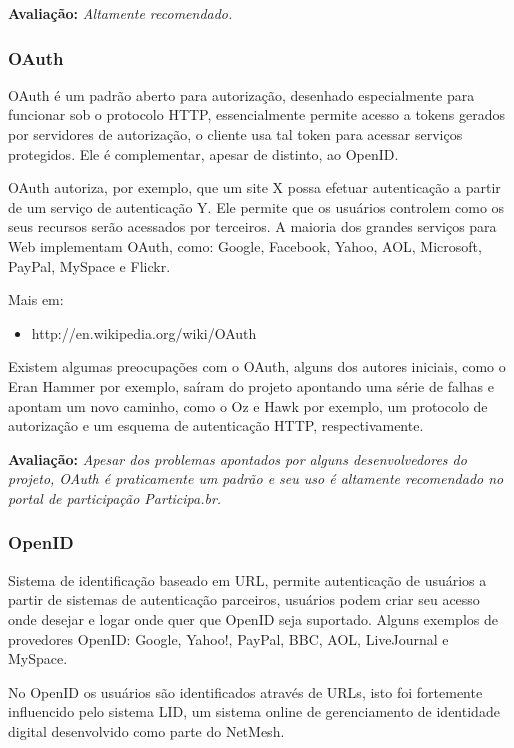 \documentclass[11pt]{article}
\begin{document}
{\bf Avaliação:} {\it Altamente recomendado.}

\subsubsection{OAuth}

OAuth é um padrão aberto para autorização, desenhado especialmente para
funcionar sob o protocolo HTTP, essencialmente permite acesso a tokens gerados
por servidores de autorização, o cliente usa tal token para acessar serviços
protegidos. Ele é complementar, apesar de distinto, ao OpenID.

OAuth autoriza, por exemplo, que um site X possa efetuar autenticação a partir
de um serviço de autenticação Y. Ele permite que os usuários controlem como os seus
recursos serão acessados por terceiros. A maioria dos grandes serviços para
Web implementam OAuth, como: Google, Facebook, Yahoo, AOL, Microsoft, PayPal,
MySpace e Flickr.

Mais em:
\begin{itemize}
  \item{http://en.wikipedia.org/wiki/OAuth}
\end{itemize}

Existem algumas preocupações com o OAuth, alguns dos autores iniciais, como o
Eran Hammer por exemplo, saíram do projeto apontando\cite{oauthRoadHell} uma
série de falhas e apontam um novo caminho, como o Oz\cite{ozProtocol} e
Hawk\cite{hawkProtocol} por exemplo, um protocolo de autorização e um esquema
de autenticação HTTP, respectivamente.

{\bf Avaliação:} {\it Apesar dos problemas apontados por alguns
desenvolvedores do projeto, OAuth é praticamente um padrão e seu uso é
altamente recomendado no portal de participação Participa.br.}

\subsubsection{OpenID}

Sistema de identificação baseado em URL, permite autenticação de usuários a
partir de sistemas de autenticação parceiros, usuários podem criar seu acesso
onde desejar e logar onde quer que OpenID seja suportado. Alguns exemplos de
provedores OpenID: Google, Yahoo!, PayPal, BBC, AOL, LiveJournal e MySpace.

No OpenID os usuários são identificados através de URLs, isto foi fortemente
influencido pelo sistema LID\cite{wikipediaLID}, um sistema online de
gerenciamento de identidade digital desenvolvido como parte do NetMesh.
\end{document}
